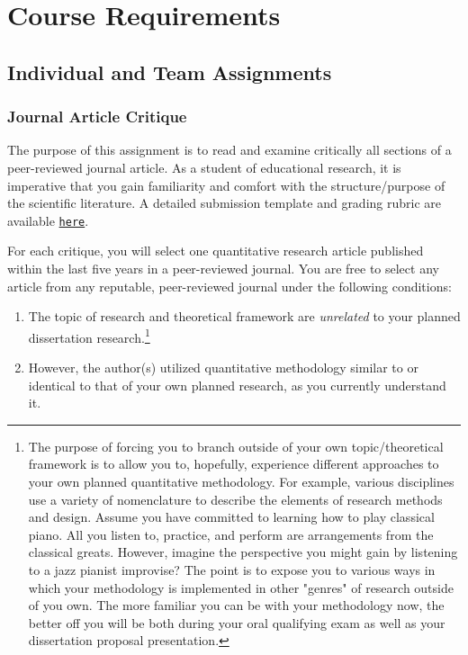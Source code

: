 \documentclass[
]{article}
\providecommand{\tightlist}{%
  \setlength{\itemsep}{0pt}\setlength{\parskip}{0pt}}
\begin{document}
\section{Course Requirements}

\subsection{Individual and Team Assignments}

\subsubsection{Journal Article Critique}

The purpose of this assignment is to read and examine critically all
sections of a peer-reviewed journal article. As a student of educational
research, it is imperative that you gain familiarity and comfort with
the structure/purpose of the scientific literature. A detailed
submission template and grading rubric are available
\texttt{\href{https://bit.ly/3aQHyns}{here}}.

For each critique, you will select one quantitative research article
published within the last five years in a peer-reviewed journal. You are
free to select any article from any reputable, peer-reviewed journal
under the following conditions:

\begin{enumerate}
\def\labelenumi{\arabic{enumi}.}
\tightlist
\item
  The topic of research and theoretical framework are \emph{unrelated}
  to your planned dissertation
  research.\footnote{The purpose of forcing you to branch outside of your own topic/theoretical framework is to allow you to, hopefully, experience different approaches to your own planned quantitative methodology. For example, various disciplines use a variety of nomenclature to describe the elements of research methods and design. Assume you have committed to learning how to play classical piano. All you listen to, practice, and perform are arrangements from the classical greats. However, imagine the perspective you might gain by listening to a jazz pianist improvise? The point is to expose you to various ways in which your methodology is implemented in other "genres" of research outside of you own. The more familiar you can be with your methodology now, the better off you will be both during your oral qualifying exam as well as your dissertation proposal presentation.}
\item
  However, the author(s) utilized quantitative methodology similar to or
  identical to that of your own planned research, as you currently
  understand it.
\end{enumerate}
\end{document}
